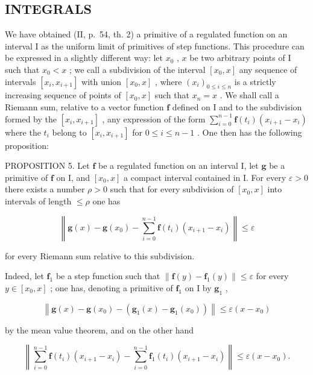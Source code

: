 \subsection{INTEGRALS}

We have obtained (II, p.~54, th. 2) a primitive of a regulated function on an interval I as the uniform limit of primitives of step functions. This procedure can be expressed in a slightly different way: let \(x_0\) , \(x\) be two arbitrary points of I such that \(x_0 < x\) ; we call a subdivision of the interval \([x_0, x]\) any sequence of intervals \([x_i, x_{i+1}]\) with union \([x_0, x]\) , where \((x_i)_{0 \leqslant i \leqslant n}\) is a strictly increasing sequence of points of \([x_0, x]\) such that \(x_n = x\) . We shall call a Riemann sum, relative to a vector function \(\mathbf{f}\) defined on I and to the subdivision formed by the \([x_i, x_{i+1}]\) , any expression of the form \(\sum_{i=0}^{n-1} \mathbf{f}(t_i)(x_{i+1} - x_i)\) where the \(t_i\) belong to \([x_i, x_{i+1}]\) for \(0 \leqslant i \leqslant n-1\) . One then has the following proposition:

PROPOSITION 5. Let \(\mathbf{f}\) be a regulated function on an interval I, let \(\mathbf{g}\) be a primitive of \(\mathbf{f}\) on I, and \([x_0, x]\) a compact interval contained in I. For every \(\varepsilon > 0\) there exists a number \(\rho > 0\) such that for every subdivision of \([x_0, x]\) into intervals of length \(\leqslant \rho\) one has

\[
\left\| \mathbf {g} (x) - \mathbf {g} (x _ {0}) - \sum_ {i = 0} ^ {n - 1} \mathbf {f} (t _ {i}) (x _ {i + 1} - x _ {i}) \right\| \leqslant \varepsilon\tag{1}
\]

for every Riemann sum relative to this subdivision.

Indeed, let \(\mathbf{f}_1\) be a step function such that \(\| \mathbf{f}(y) - \mathbf{f}_1(y)\| \leqslant \varepsilon\) for every \(y\in [x_0,x]\) ; one has, denoting a primitive of \(\mathbf{f}_1\) on I by \(\mathbf{g}_1\) ,

\[
\left\| \mathbf {g} (x) - \mathbf {g} \left(x _ {0}\right) - \left(\mathbf {g} _ {1} (x) - \mathbf {g} _ {1} \left(x _ {0}\right)\right) \right\| \leqslant \varepsilon \left(x - x _ {0}\right)
\]

by the mean value theorem, and on the other hand

\[
\left\| \sum_ {i = 0} ^ {n - 1} \mathbf {f} (t _ {i}) (x _ {i + 1} - x _ {i}) - \sum_ {i = 0} ^ {n - 1} \mathbf {f} _ {1} (t _ {i}) (x _ {i + 1} - x _ {i}) \right\| \leqslant \varepsilon (x - x _ {0}).
\]

